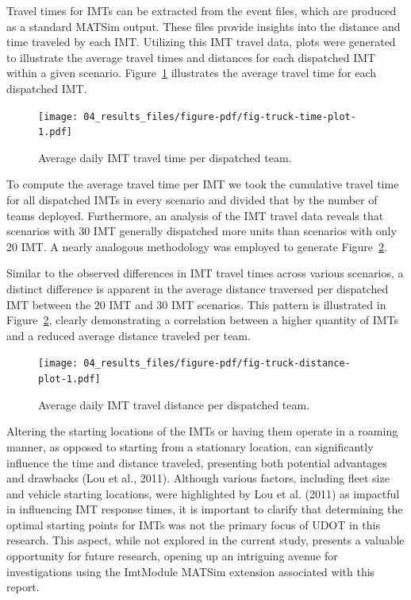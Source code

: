 \documentclass[fancy, oneside, mastersfancy, ms]{byuthesis}
\begin{document}
Travel times for IMTs can be extracted from the event files, which are
produced as a standard MATSim output. These files provide insights into
the distance and time traveled by each IMT. Utilizing this IMT travel
data, plots were generated to illustrate the average travel times and
distances for each dispatched IMT within a given scenario.
Figure~\ref{fig-truck-time-plot} illustrates the average travel time for
each dispatched IMT.

\begin{figure}

{\centering \texttt{[image: 04\_results\_files/figure-pdf/fig-truck-time-plot-1.pdf]}

}

\caption{\label{fig-truck-time-plot}Average daily IMT travel time per
dispatched team.}

\end{figure}

To compute the average travel time per IMT we took the cumulative travel
time for all dispatched IMTs in every scenario and divided that by the
number of teams deployed. Furthermore, an analysis of the IMT travel
data reveals that scenarios with 30 IMT generally dispatched more units
than scenarios with only 20 IMT. A nearly analogous methodology was
employed to generate Figure~\ref{fig-truck-distance-plot}.

Similar to the observed differences in IMT travel times across various
scenarios, a distinct difference is apparent in the average distance
traversed per dispatched IMT between the 20 IMT and 30 IMT scenarios.
This pattern is illustrated in Figure~\ref{fig-truck-distance-plot},
clearly demonstrating a correlation between a higher quantity of IMTs
and a reduced average distance traveled per team.

\begin{figure}

{\centering \texttt{[image: 04\_results\_files/figure-pdf/fig-truck-distance-plot-1.pdf]}

}

\caption{\label{fig-truck-distance-plot}Average daily IMT travel
distance per dispatched team.}

\end{figure}

Altering the starting locations of the IMTs or having them operate in a
roaming manner, as opposed to starting from a stationary location, can
significantly influence the time and distance traveled, presenting both
potential advantages and drawbacks (Lou et al., 2011). Although various
factors, including fleet size and vehicle starting locations, were
highlighted by Lou et al. (2011) as impactful in influencing IMT
response times, it is important to clarify that determining the optimal
starting points for IMTs was not the primary focus of UDOT in this
research. This aspect, while not explored in the current study, presents
a valuable opportunity for future research, opening up an intriguing
avenue for investigations using the ImtModule MATSim extension
associated with this report.
\end{document}
